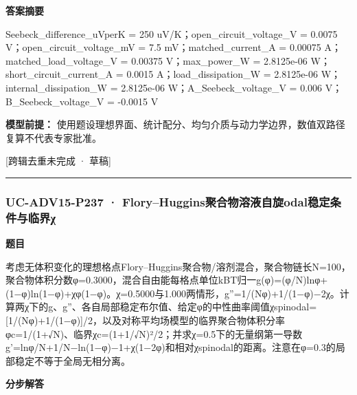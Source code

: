 \documentclass[UTF8,11pt,a4paper]{ctexart}
\begin{document}
\noindent\textbf{答案摘要}\par
Seebeck\_difference\_uVperK = 250 uV/K；open\_circuit\_voltage\_V = 0.0075 V；open\_circuit\_voltage\_mV = 7.5 mV；matched\_current\_A = 0.00075 A；matched\_load\_voltage\_V = 0.00375 V；max\_power\_W = 2.8125e-06 W；short\_circuit\_current\_A = 0.0015 A；load\_dissipation\_W = 2.8125e-06 W；internal\_dissipation\_W = 2.8125e-06 W；A\_Seebeck\_voltage\_V = 0.006 V；B\_Seebeck\_voltage\_V = -0.0015 V\par
\noindent\textbf{模型前提：}
使用题设理想界面、统计配分、均匀介质与动力学边界，数值双路径复算不代表专家批准。\par
\noindent\textcolor{red!65!black}{[跨辑去重未完成 · 草稿]} \par
\medskip\hrule\medskip
{}
\subsubsection*{UC-ADV15-P237 · Flory–Huggins聚合物溶液自旋odal稳定条件与临界χ}
\noindent\textbf{题目}\par
考虑无体积变化的理想格点Flory–Huggins聚合物/溶剂混合，聚合物链长N=100，聚合物体积分数φ=0.3000，混合自由能每格点单位kBT归一g(φ)=(φ/N)lnφ+(1−φ)ln(1−φ)+χφ(1−φ)。χ=0.5000与1.000两情形，g''=1/(Nφ)+1/(1−φ)−2χ。计算两χ下的g、g''、各自局部稳定布尔值、给定φ的中性曲率阈值χspinodal=[1/(Nφ)+1/(1−φ)]/2，以及对称平均场模型的临界聚合物体积分率φc=1/(1+√N)、临界χc=(1+1/√N)²/2；并求χ=0.5下的无量纲第一导数g'=lnφ/N+1/N−ln(1−φ)−1+χ(1−2φ)和相对χspinodal的距离。注意在φ=0.3的局部稳定不等于全局无相分离。\par
\medskip\noindent\textbf{分步解答}
\end{document}
